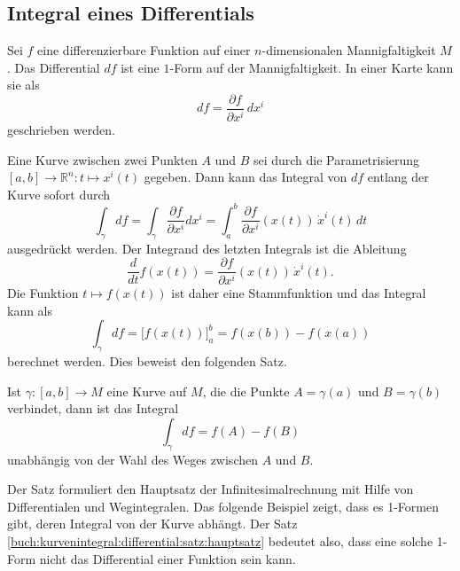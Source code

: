 %
%
\subsection{Integral eines Differentials}
Sei $f$ eine differenzierbare Funktion auf einer $n$-dimensionalen
Mannigfaltigkeit $M$.
Das Differential $df$ ist eine $1$-Form auf der Mannigfaltigkeit.
In einer Karte kann sie als
\[
df
=
\frac{\partial f}{\partial x^i}\,dx^i
\]
geschrieben werden.

Eine Kurve zwischen zwei Punkten $A$ und $B$ sei durch die 
Parametrisierung $[a,b]\to\mathbb{R}^n:t\mapsto x^i(t)$ gegeben.
Dann kann das Integral von $df$ entlang der Kurve sofort durch
\[
\int_{\gamma} df
=
\int_{\gamma} \frac{\partial f}{\partial x^i} dx^i
=
\int_a^b \frac{\partial f}{\partial x^i}(x(t))\,\dot{x}^i(t)\,dt
\]
ausgedrückt werden.
Der Integrand des letzten Integrals ist die Ableitung
\[
\frac{d}{dt} f(x(t))
=
\frac{\partial f}{\partial x^i}(x(t))\,\dot{x}^i(t).
\]
Die Funktion $t\mapsto f(x(t))$ ist daher eine Stammfunktion und
das Integral kann als
\[
\int_{\gamma} df
=
\bigl[ f(x(t)) \bigr]_a^b
=
f(x(b)) - f(x(a))
\]
berechnet werden.
Dies beweist den folgenden Satz.

\begin{satz}
\label{buch:kurvenintegral:differential:satz:hauptsatz}
Ist $\gamma\colon[a,b]\to M$ eine Kurve auf $M$, die die Punkte $A=\gamma(a)$
und $B=\gamma(b)$ verbindet, dann ist das Integral
\[
\int_\gamma df
=
f(A) - f(B)
\]
unabhängig von der Wahl des Weges zwischen $A$ und $B$.
\end{satz}

Der Satz formuliert den Hauptsatz der Infinitesimalrechnung mit Hilfe
von Differentialen und Wegintegralen.
Das folgende Beispiel zeigt, dass es 1-Formen gibt, deren Integral
von der Kurve abhängt.
Der Satz \ref{buch:kurvenintegral:differential:satz:hauptsatz}
bedeutet also, dass eine solche 1-Form nicht das Differential
einer Funktion sein kann.


